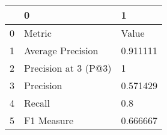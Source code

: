\begin{tabular}{lll}
\toprule
{} &                     0 &         1 \\
\midrule
0 &                Metric &     Value \\
1 &     Average Precision &  0.911111 \\
2 &  Precision at 3 (P@3) &         1 \\
3 &             Precision &  0.571429 \\
4 &                Recall &       0.8 \\
5 &            F1 Measure &  0.666667 \\
\bottomrule
\end{tabular}
